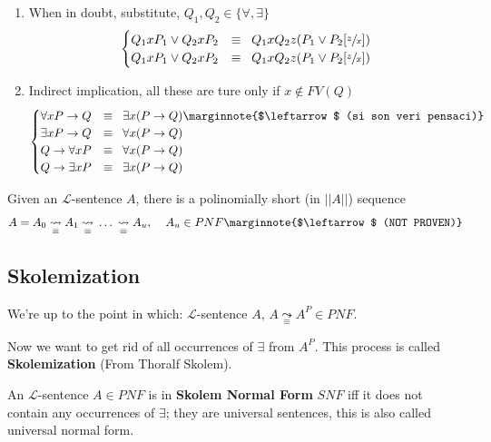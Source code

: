 \begin{enumerate}
\item  When in doubt, substitute, $Q_{1}, Q_{2} \in  \{\forall, \exists\}$
$$
\begin{cases}
	Q_1 x P_1 \vee Q_2 x P_2 &\equiv \;\; Q_1 x Q_2 z (P_1 \vee P_2 [\sfrac{z}{x}]) \\
	Q_1 x P_1 \vee Q_2 x P_2 &\equiv \;\; Q_1 x Q_2 z (P_1 \vee P_2 [\sfrac{z}{x}]) \\
\end{cases}
$$

\item Indirect implication, all these are ture only if $x \notin FV(Q)$
$$
\begin{cases}
	\forall x P \rightarrow Q & \equiv \;\; \exists x (P \rightarrow Q) \marginnote{$\leftarrow$ (si son veri pensaci)} \\
	\exists x P \rightarrow Q & \equiv \;\; \forall x (P \rightarrow Q) \\
	Q \rightarrow \forall x P & \equiv \;\; \forall x (P \rightarrow Q) \\
	Q \rightarrow \exists x P & \equiv \;\; \exists x (P \rightarrow Q) \\
\end{cases}
$$

\end{enumerate}			

\begin{fact}
Given an $\mathcal{L}$-sentence $A$, there is a polinomially short (in $||A||$) sequence
$$ A = A_0 \underset{\equiv}{\leadsto} A_1 \underset{\equiv}{\leadsto} \, \dots \, \underset{\equiv}{\leadsto} A_u, \;\;\;\; A_u \in PNF \marginnote{$\leftarrow$ (NOT PROVEN)} $$
\end{fact}


\vspace{-0.75cm}

\subsection{Skolemization}

We're up to the point in which:
$\mathcal{L}$-sentence $A$, $A \underset{\equiv}{\leadsto} A^P \in PNF$.

Now we want to get rid of all occurrences of $\exists$ from $A^P$. This process is called \textbf{Skolemization} (From Thoralf Skolem).

\begin{definition}
  An $\mathcal{L}$-sentence $A \in PNF$ is in \textbf{Skolem Normal Form} $SNF$ iff it does not contain any occurrences of $\exists$; they are universal sentences, this is also called universal normal form.
\end{definition}

